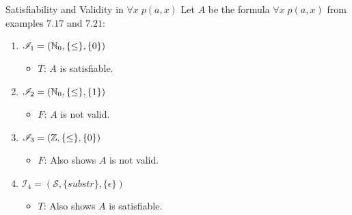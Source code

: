 \documentclass[style=sailor,size=12pt]{powerdot}
\begin{document}
\begin{wideslide}[bm=,toc=]{Satisfiability and Validity in $\forall x \; p(a,x)$}
Let $A$ be the formula $\forall x \; p(a,x)$ from examples $7.17$ and $7.21$:
\begin{enumerate}
\item<2-> $\mathcal{I}_1 = (\mathbb{N}_0,\{\leq\},\{0\})$
\begin{itemize}
\item<3-> $T$: $A$ is satisfiable. 
\end{itemize}
\item<4-> $\mathcal{I}_2 = (\mathbb{N}_0,\{\leq\},\{1\})$
\begin{itemize}
\item<5-> $F$: $A$ is not valid. 
\end{itemize}
\item<6-> $\mathcal{I}_3 = (\mathbb{Z},\{\leq\},\{0\})$
\begin{itemize}
\item<7-> $F$: Also shows $A$ is not valid. 
\end{itemize}
\item<8-> $\mathcal{I}_4 = (\mathcal{S},\{substr\},\{ \epsilon \})$
\begin{itemize}
\item<9-> $T$: Also shows $A$ is satisfiable. 
\end{itemize}
\end{enumerate}
\end{wideslide}
\end{document}
